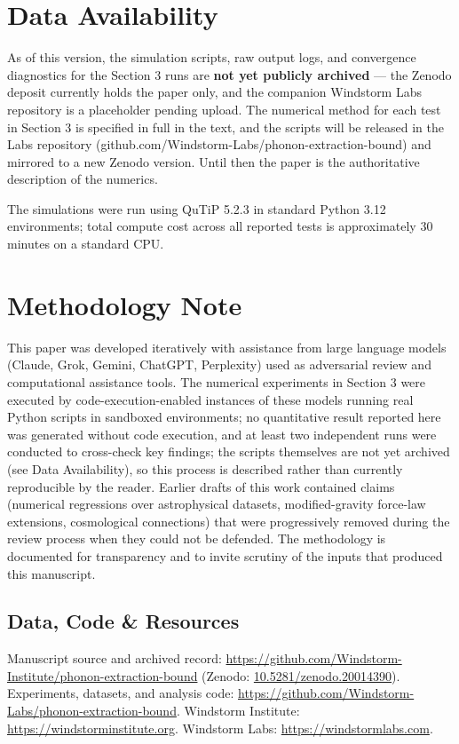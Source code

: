 \documentclass[11pt]{article}
\begin{document}
\section*{Data Availability}\label{data-availability}

As of this version, the simulation scripts, raw output logs, and convergence diagnostics for the Section 3 runs are \textbf{not yet publicly archived} --- the Zenodo deposit currently holds the paper only, and the companion Windstorm Labs repository is a placeholder pending upload. The numerical method for each test in Section 3 is specified in full in the text, and the scripts will be released in the Labs repository (github.com/Windstorm-Labs/phonon-extraction-bound) and mirrored to a new Zenodo version. Until then the paper is the authoritative description of the numerics.

The simulations were run using QuTiP 5.2.3 in standard Python 3.12 environments; total compute cost across all reported tests is approximately 30 minutes on a standard CPU.

\section*{Methodology Note}\label{methodology-note}

This paper was developed iteratively with assistance from large language models (Claude, Grok, Gemini, ChatGPT, Perplexity) used as adversarial review and computational assistance tools. The numerical experiments in Section 3 were executed by code-execution-enabled instances of these models running real Python scripts in sandboxed environments; no quantitative result reported here was generated without code execution, and at least two independent runs were conducted to cross-check key findings; the scripts themselves are not yet archived (see Data Availability), so this process is described rather than currently reproducible by the reader. Earlier drafts of this work contained claims (numerical regressions over astrophysical datasets, modified-gravity force-law extensions, cosmological connections) that were progressively removed during the review process when they could not be defended. The methodology is documented for transparency and to invite scrutiny of the inputs that produced this manuscript.

\subsection*{Data, Code \& Resources}
\noindent Manuscript source and archived record: \url{https://github.com/Windstorm-Institute/phonon-extraction-bound} (Zenodo: \href{https://doi.org/10.5281/zenodo.20014390}{10.5281/zenodo.20014390}). Experiments, datasets, and analysis code: \url{https://github.com/Windstorm-Labs/phonon-extraction-bound}. Windstorm Institute: \url{https://windstorminstitute.org}. Windstorm Labs: \url{https://windstormlabs.com}.
\end{document}
